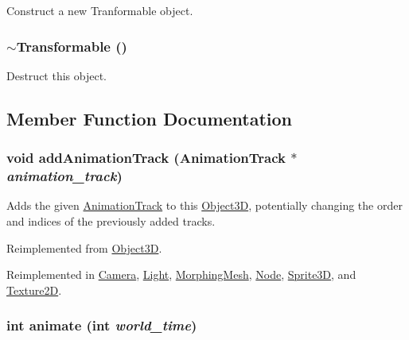 Construct a new Tranformable object. \hypertarget{classm3g_1_1Transformable_89d9c7912ed11a30a312fd8f72b9ab22}{
\subsubsection[{$\sim$Transformable}]{\setlength{\rightskip}{0pt plus 5cm}$\sim${\bf Transformable} ()}}
\label{classm3g_1_1Transformable_89d9c7912ed11a30a312fd8f72b9ab22}


Destruct this object. 

\subsection{Member Function Documentation}
\hypertarget{classm3g_1_1Transformable_415c0b110f95410ded9b85e5d99a496b}{
\subsubsection[{addAnimationTrack}]{\setlength{\rightskip}{0pt plus 5cm}void addAnimationTrack ({\bf AnimationTrack} $\ast$ {\em animation\_\-track})}}
\label{classm3g_1_1Transformable_415c0b110f95410ded9b85e5d99a496b}


Adds the given \hyperlink{classm3g_1_1AnimationTrack}{AnimationTrack} to this \hyperlink{classm3g_1_1Object3D}{Object3D}, potentially changing the order and indices of the previously added tracks. 

Reimplemented from \hyperlink{classm3g_1_1Object3D_415c0b110f95410ded9b85e5d99a496b}{Object3D}.

Reimplemented in \hyperlink{classm3g_1_1Camera_415c0b110f95410ded9b85e5d99a496b}{Camera}, \hyperlink{classm3g_1_1Light_415c0b110f95410ded9b85e5d99a496b}{Light}, \hyperlink{classm3g_1_1MorphingMesh_415c0b110f95410ded9b85e5d99a496b}{MorphingMesh}, \hyperlink{classm3g_1_1Node_415c0b110f95410ded9b85e5d99a496b}{Node}, \hyperlink{classm3g_1_1Sprite3D_415c0b110f95410ded9b85e5d99a496b}{Sprite3D}, and \hyperlink{classm3g_1_1Texture2D_415c0b110f95410ded9b85e5d99a496b}{Texture2D}.\hypertarget{classm3g_1_1Transformable_8aad1ceab4c2a03609c8a42324ce484d}{
\subsubsection[{animate}]{\setlength{\rightskip}{0pt plus 5cm}int animate (int {\em world\_\-time})}}
\label{classm3g_1_1Transformable_8aad1ceab4c2a03609c8a42324ce484d}


